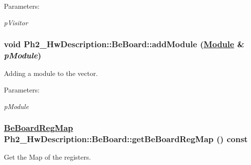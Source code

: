 \begin{Desc}
\item[Parameters:]
\begin{description}
\item[{\em p\-Visitor}]\end{description}
\end{Desc}
\hypertarget{class_ph2___hw_description_1_1_be_board_5242925c065165be9b407dabf889ac9a}{
\subsubsection[addModule]{\setlength{\rightskip}{0pt plus 5cm}void Ph2\_\-Hw\-Description::Be\-Board::add\-Module (\hyperlink{class_ph2___hw_description_1_1_module}{Module} \& {\em p\-Module})}}
\label{class_ph2___hw_description_1_1_be_board_5242925c065165be9b407dabf889ac9a}


Adding a module to the vector. 

\begin{Desc}
\item[Parameters:]
\begin{description}
\item[{\em p\-Module}]\end{description}
\end{Desc}
\hypertarget{class_ph2___hw_description_1_1_be_board_d7a7bbe35ca9558c89c6fd349532fd0d}{
\subsubsection[getBeBoardRegMap]{\setlength{\rightskip}{0pt plus 5cm}\hyperlink{namespace_ph2___hw_description_2e13fb82c8ed98154c60f9d0f8467d72}{Be\-Board\-Reg\-Map} Ph2\_\-Hw\-Description::Be\-Board::get\-Be\-Board\-Reg\-Map () const}}
\label{class_ph2___hw_description_1_1_be_board_d7a7bbe35ca9558c89c6fd349532fd0d}


Get the Map of the registers. 


